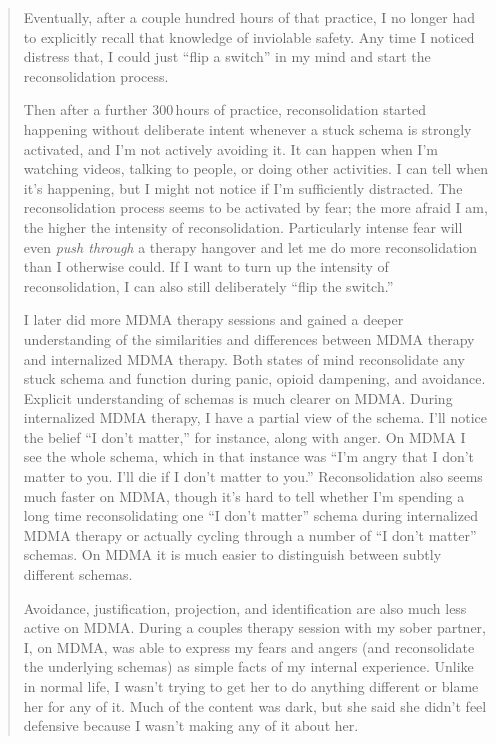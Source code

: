 \documentclass[11pt,oneside]{book}
\begin{document}
\begin{quotation}
    Eventually, after a couple hundred hours of that practice, I no longer had to explicitly recall that knowledge of inviolable safety. Any time I noticed distress that, I could just \enquote{flip a switch} in my mind and start the reconsolidation process.

    Then after a further 300\,hours of practice, reconsolidation started happening without deliberate intent whenever a stuck schema is strongly activated, and I'm not actively avoiding it. It can happen when I'm watching videos, talking to people, or doing other activities. I can tell when it's happening, but I might not notice if I'm sufficiently distracted. The reconsolidation process seems to be activated by fear; the more afraid I am, the higher the intensity of reconsolidation. Particularly intense fear will even \textit{push through} a therapy hangover and let me do more reconsolidation than I otherwise could. If I want to turn up the intensity of reconsolidation, I can also still deliberately \enquote{flip the switch.}

    I later did more MDMA therapy sessions and gained a deeper understanding of the similarities and differences between MDMA therapy and internalized MDMA therapy. Both states of mind reconsolidate any stuck schema and function during panic, opioid dampening, and avoidance. Explicit understanding of schemas is much clearer on MDMA. During internalized MDMA therapy, I have a partial view of the schema. I'll notice the belief \enquote{I don't matter,} for instance, along with anger. On MDMA I see the whole schema, which in that instance was \enquote{I'm angry that I don't matter to you. I'll die if I don't matter to you.} Reconsolidation also seems much faster on MDMA, though it's hard to tell whether I'm spending a long time reconsolidating one \enquote{I don't matter} schema during internalized MDMA therapy or actually cycling through a number of \enquote{I don't matter} schemas. On MDMA it is much easier to distinguish between subtly different schemas.
    
    Avoidance, justification, projection, and identification are also much less active on MDMA. During a couples therapy session with my sober partner, I, on MDMA, was able to express my fears and angers (and reconsolidate the underlying schemas) as simple facts of my internal experience. Unlike in normal life, I wasn't trying to get her to do anything different or blame her for any of it. Much of the content was dark, but she said she didn't feel defensive because I wasn't making any of it about her.


\end{quotation}
\end{document}
